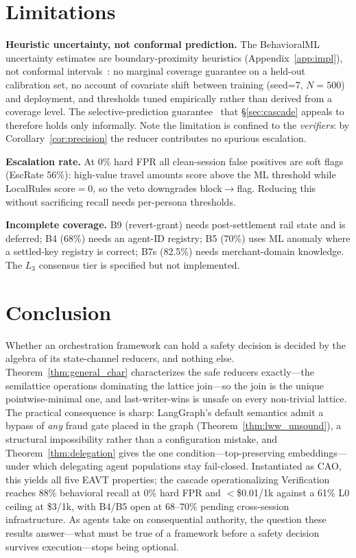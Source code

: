 \documentclass{article}
\begin{document}
\section{Limitations}
\label{sec:discussion_limits}

\textbf{Heuristic uncertainty, not conformal prediction.} The BehavioralML uncertainty
estimates are boundary-proximity heuristics (Appendix~\ref{app:impl}), not conformal
intervals~\cite{conformal}: no marginal coverage guarantee on a held-out calibration set,
no account of covariate shift between training (seed=7, $N{=}500$) and deployment, and
thresholds tuned empirically rather than derived from a coverage level. The
selective-prediction guarantee~\cite{selective} that \S\ref{sec:cascade} appeals to
therefore holds only informally. Note the limitation is confined to the \emph{verifiers}:
by Corollary~\ref{cor:precision} the reducer contributes no spurious escalation.

\textbf{Escalation rate.} At 0\% hard FPR all clean-session false positives are soft flags
(EscRate 56\%): high-value travel amounts score above the ML threshold while LocalRules
score$=0$, so the veto downgrades block$\to$flag. Reducing this without sacrificing recall
needs per-persona thresholds.

\textbf{Incomplete coverage.} B9 (revert-grant) needs post-settlement rail state and is
deferred; B4 (68\%) needs an agent-ID registry; B5 (70\%) uses ML anomaly where a settled-key
registry is correct; B7s (82.5\%) needs merchant-domain knowledge. The $L_3$ consensus tier is
specified but not implemented.

\section{Conclusion}

Whether an orchestration framework can hold a safety decision is decided by the algebra of its
state-channel reducers, and nothing else. Theorem~\ref{thm:general_char} characterizes the safe
reducers exactly---the semilattice operations dominating the lattice join---so the join is the
unique pointwise-minimal one, and last-writer-wins is unsafe on every non-trivial lattice.
The practical consequence is sharp: LangGraph's default semantics admit a bypass of \emph{any}
fraud gate placed in the graph (Theorem~\ref{thm:lww_unsound}), a structural impossibility
rather than a configuration mistake, and Theorem~\ref{thm:delegation} gives the one
condition---top-preserving embeddings---under which delegating agent populations stay
fail-closed. Instantiated as CAO, this yields all five EAVT properties; the cascade
operationalizing Verification reaches 88\% behavioral recall at 0\% hard FPR and $<$\$0.01/1k
against a 61\% L0 ceiling at \$3/1k, with B4/B5 open at 68--70\% pending cross-session
infrastructure. As agents take on consequential authority, the question these results
answer---what must be true of a framework before a safety decision survives execution---stops
being optional.
\end{document}
